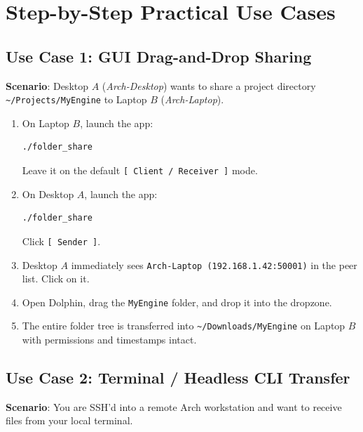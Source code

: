\documentclass[11pt,a4paper]{article}
\begin{document}
\section{Step-by-Step Practical Use Cases}

\subsection{Use Case 1: GUI Drag-and-Drop Sharing}
\textbf{Scenario}: Desktop $A$ (\textit{Arch-Desktop}) wants to share a project directory \texttt{\textasciitilde/Projects/MyEngine} to Laptop $B$ (\textit{Arch-Laptop}).

\begin{enumerate}
    \item On Laptop $B$, launch the app:
    \begin{lstlisting}[style=bashblock]
./folder_share
    \end{lstlisting}
    Leave it on the default \texttt{[ Client / Receiver ]} mode.
    \item On Desktop $A$, launch the app:
    \begin{lstlisting}[style=bashblock]
./folder_share
    \end{lstlisting}
    Click \texttt{[ Sender ]}.
    \item Desktop $A$ immediately sees \texttt{Arch-Laptop (192.168.1.42:50001)} in the peer list. Click on it.
    \item Open Dolphin, drag the \texttt{MyEngine} folder, and drop it into the dropzone.
    \item The entire folder tree is transferred into \texttt{\textasciitilde/Downloads/MyEngine} on Laptop $B$ with permissions and timestamps intact.
\end{enumerate}

\subsection{Use Case 2: Terminal / Headless CLI Transfer}
\textbf{Scenario}: You are SSH'd into a remote Arch workstation and want to receive files from your local terminal.
\end{document}
